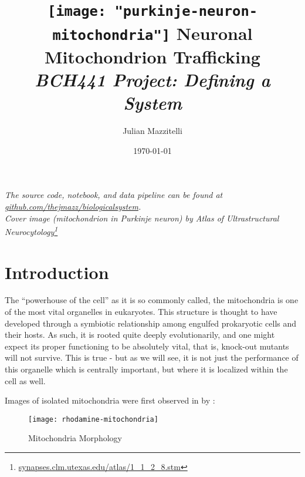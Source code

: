 \title{
\vspace{-155pt}
\hspace*{-80pt}\texttt{[image: "purkinje-neuron-mitochondria"]}
Neuronal Mitochondrion Trafficking \\
\small{\textit{BCH441 Project: Defining a System}}
}
\author{Julian Mazzitelli}
\date{\today}

\maketitle

\begin{bottompar}
\begin{center}
\textit{
The source code, notebook, and data pipeline can be found at
\href{https://github.com/thejmazz/biologicalsystem}{github.com/thejmazz/biologicalsystem}. \\
Cover image (mitochondrion in Purkinje neuron) by Atlas of Ultrastructural Neurocytology\footnote{\href{http://synapses.clm.utexas.edu/atlas/1_1_2_8.stm}{synapses.clm.utexas.edu/atlas/1\_1\_2\_8.stm}}
}
\end{center}
\end{bottompar}

\tableofcontents


\section{Introduction}

The ``powerhouse of the cell'' as it is so commonly called, the mitochondria is
one of the most vital organelles in eukaryotes. This structure is thought to
have developed through a symbiotic relationship among engulfed prokaryotic cells
and their hosts. As such, it is rooted quite deeply evolutionarily, and one
might expect its proper functioning to be absolutely vital, that is, knock-out
mutants will not survive. This is true - but as we will see, it is not just the
performance of this organelle which is centrally important, but where it is
localized within the cell as well.

Images of isolated mitochondria were first observed in \citeyear{Lincoln1979}
by \citeauthor{Lincoln1979}:

\begin{figure}[h!]
  \centering
  \texttt{[image: rhodamine-mitochondria]}
  \caption{Mitochondria Morphology}
\end{figure}

